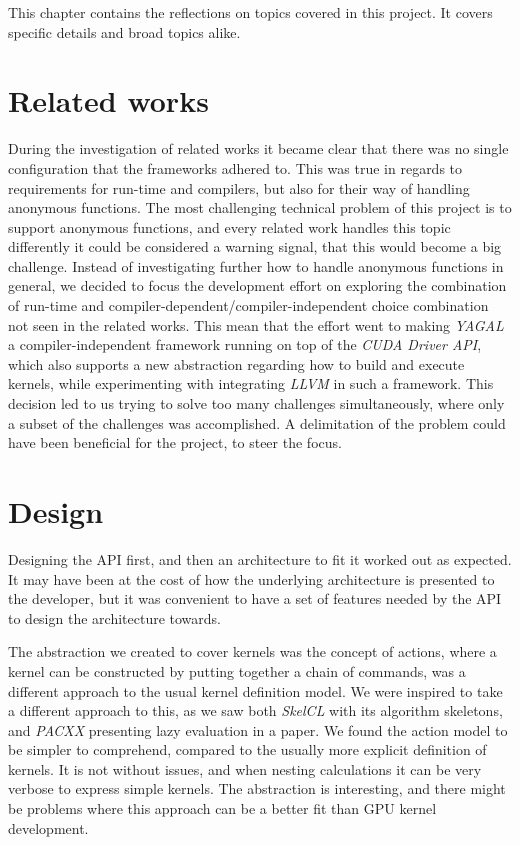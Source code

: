 \label{cha:reflection}
This chapter contains the reflections on topics covered in this project. It covers specific details and broad topics alike.

\section{Related works}
During the investigation of related works it became clear that there was no single configuration that the frameworks adhered to. This was true in regards to requirements for run-time and compilers, but also for their way of handling anonymous functions. The most challenging technical problem of this project is to support anonymous functions, and every related work handles this topic differently it could be considered a warning signal, that this would become a big challenge. Instead of investigating further how to handle anonymous functions in general, we decided to focus the development effort on exploring the combination of run-time and compiler-dependent/compiler-independent choice combination not seen in the related works. This mean that the effort went to making \textit{YAGAL} a compiler-independent framework running on top of the \textit{CUDA Driver API}, which also supports a new abstraction regarding how to build and execute kernels, while experimenting with integrating \textit{LLVM} in such a framework. This decision led to us trying to solve too many challenges simultaneously, where only a subset of the challenges was accomplished. A delimitation of the problem could have been beneficial for the project, to steer the focus.

\section{Design}
Designing the API first, and then an architecture to fit it worked out as expected. It may have been at the cost of how the underlying architecture is presented to the developer, but it was convenient to have a set of features needed by the API to design the architecture towards.

The abstraction we created to cover kernels was the concept of actions, where a kernel can be constructed by putting together a chain of commands, was a different approach to the usual kernel definition model. We were inspired to take a different approach to this, as we saw both \textit{SkelCL} with its algorithm skeletons, and \textit{PACXX} presenting lazy evaluation in a paper\cite{lazyPacxx}. We found the action model to be simpler to comprehend, compared to the usually more explicit definition of kernels. It is not without issues, and when nesting calculations it can be very verbose to express simple kernels. The abstraction is interesting, and there might be problems where this approach can be a better fit than GPU kernel development.

